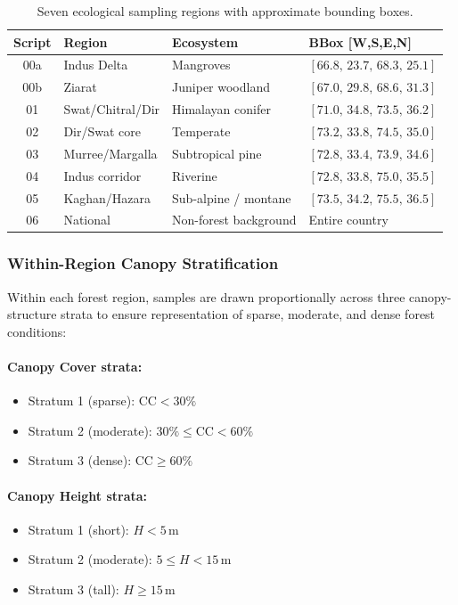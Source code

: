 \documentclass[12pt,a4paper,twoside]{article}
\newcommand{\CC}{\text{CC}}
\begin{document}
\begin{table}[H]
\centering
\caption{Seven ecological sampling regions with approximate bounding boxes.}
\label{tab:sampling_regions}
\small
\begin{tabular}{@{}c l l l@{}}
\toprule
\textbf{Script} & \textbf{Region} & \textbf{Ecosystem} & \textbf{BBox [W,S,E,N]} \\
\midrule
00a & Indus Delta & Mangroves & $[66.8,\,23.7,\,68.3,\,25.1]$ \\
00b & Ziarat & Juniper woodland & $[67.0,\,29.8,\,68.6,\,31.3]$ \\
01  & Swat/Chitral/Dir & Himalayan conifer & $[71.0,\,34.8,\,73.5,\,36.2]$ \\
02  & Dir/Swat core & Temperate & $[73.2,\,33.8,\,74.5,\,35.0]$ \\
03  & Murree/Margalla & Subtropical pine & $[72.8,\,33.4,\,73.9,\,34.6]$ \\
04  & Indus corridor & Riverine & $[72.8,\,33.8,\,75.0,\,35.5]$ \\
05  & Kaghan/Hazara & Sub-alpine / montane & $[73.5,\,34.2,\,75.5,\,36.5]$ \\
06  & National & Non-forest background & Entire country \\
\bottomrule
\end{tabular}
\end{table}

\subsubsection{Within-Region Canopy Stratification}

Within each forest region, samples are drawn proportionally across three
canopy-structure strata to ensure representation of sparse, moderate, and dense
forest conditions:

\paragraph{Canopy Cover strata:}
\begin{itemize}[nosep]
  \item Stratum 1 (sparse): $\CC < 30\%$
  \item Stratum 2 (moderate): $30\% \leq \CC < 60\%$
  \item Stratum 3 (dense): $\CC \geq 60\%$
\end{itemize}

\paragraph{Canopy Height strata:}
\begin{itemize}[nosep]
  \item Stratum 1 (short): $H < 5$\,m
  \item Stratum 2 (moderate): $5 \leq H < 15$\,m
  \item Stratum 3 (tall): $H \geq 15$\,m
\end{itemize}
\end{document}
